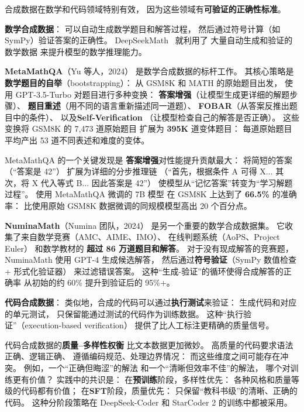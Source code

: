 合成数据在数学和代码领域特别有效，
因为这些领域有\textbf{可验证的正确性标准}。

\textbf{数学合成数据}：
可以自动生成数学题目和解答过程，
然后通过符号计算（如 SymPy）验证答案的正确性。
DeepSeekMath~\cite{shao2024grpo} 就利用了
大量自动生成和验证的数学数据
来提升模型的数学推理能力。

\textbf{MetaMathQA}（Yu 等人，2024）%
是数学合成数据的标杆工作。
其核心策略是\textbf{数学题目的自举}（bootstrapping）：
从 GSM8K 和 MATH 的原始题目出发，
使用 GPT-3.5-Turbo 对题目进行多种变换：
\textbf{答案增强}（让模型生成更详细的解题步骤）、
\textbf{题目重述}（用不同的语言重新描述同一道题）、
\textbf{FOBAR}（从答案反推出题目中的条件）、
以及\textbf{Self-Verification}
（让模型检查自己的解答是否正确）。
这些变换将 GSM8K 的 7,473 道原始题目
扩展为 \textbf{395K} 道变体题目：
每道原始题目平均产出 53 道不同表述和难度的变体。

MetaMathQA 的一个关键发现是
\textbf{答案增强}对性能提升贡献最大：
将简短的答案（“答案是 42”）
扩展为详细的分步推理链
（“首先，根据条件 A 可得 X...
其次，将 X 代入等式 B...
因此答案是 42”）
使模型从“记忆答案”转变为“学习解题过程”。
使用 MetaMathQA 微调的 7B 模型
在 GSM8K 上达到了 \textbf{66.5\%} 的准确率：
比使用原始 GSM8K 数据微调的同规模模型高出 20 个百分点。

\textbf{NuminaMath}（Numina 团队，2024）
是另一个重要的数学合成数据集。
它收集了来自数学竞赛（AMC、AIME、IMO）、
在线判题系统（AoPS、Project Euler）
和数学教材的 \textbf{超过 86 万道题目和解答}。
对于没有现成解答的竞赛题，
NuminaMath 使用 GPT-4 生成候选解答，
然后通过\textbf{符号验证}（SymPy 数值检查 + 形式化验证器）
来过滤错误答案。
这种“生成-验证”的循环使得合成解答的正确率
从初始的约 60\% 提升到验证后的 95\%+。

\textbf{代码合成数据}：
类似地，合成的代码可以通过\textbf{执行测试}来验证：
生成代码和对应的单元测试，
只保留能通过测试的代码作为训练数据。
这种“执行验证”（execution-based verification）
提供了比人工标注更精确的质量信号。

代码合成数据的\textbf{质量--多样性权衡}
比文本数据更加微妙。
高质量的代码要求语法正确、逻辑正确、
遵循编码规范、处理边界情况：
而这些维度之间可能存在冲突。
例如，一个“正确但晦涩”的解法
和一个“清晰但效率不佳”的解法，
哪个对训练更有价值？
实践中的共识是：
在\textbf{预训练}阶段，多样性优先：
各种风格和质量等级的代码都有价值；
在\textbf{SFT}阶段，质量优先：
只保留“教科书级”的清晰、正确的代码。
这种分阶段策略在 DeepSeek-Coder 和 StarCoder 2
的训练中都被采用。

